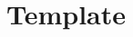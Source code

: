 \documentclass[aspectratio=169,utf8]{beamer}
\begin{document}
%
%
%
%
%
%

\section{Template}
\end{document}
